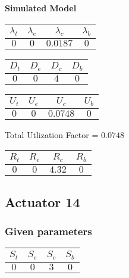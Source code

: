 \documentclass{article}
\begin{document}
\begin{minipage}{0.5\textwidth}
\centering	\textbf{Simulated Model}
\begin{table}[H]
\centering
\begin{tabular}{@{}cccc@{}}
\toprule
$\lambda_t$ & $\lambda_e$ & $\lambda_c$ & $\lambda_b$\\
\midrule
$0$ & $0$ & $0.0187$ & $0$\\
\bottomrule
\end{tabular}
\end{table}
\begin{table}[H]
\centering
\begin{tabular}{@{}cccc@{}}
\toprule
$D_t$ & $D_e$ & $D_c$ & $D_b$\\
\midrule
$0$ & $0$ & $4$ & $0$\\
\bottomrule
\end{tabular}
\end{table}\begin{table}[H]
\centering
\begin{tabular}{@{}cccc@{}}
\toprule
$U_t$ & $U_e$ & $U_c$ & $U_b$\\
\midrule
$0$ & $0$ & $0.0748$ & $0$\\
\bottomrule
\end{tabular}
\end{table}
\centering Total Utlization Factor = $0.0748$
\begin{table}[H]
\centering
\begin{tabular}{@{}cccc@{}}
\toprule
$R_t$ & $R_e$ & $R_c$ & $R_b$\\
\midrule
$0$ & $0$ & $4.32$ & $0$\\
\bottomrule
\end{tabular}
\end{table}
\end{minipage}\subsection{Actuator 14}
\subsubsection{Given parameters}
\begin{table}[H]
\centering
\begin{tabular}{@{}cccc@{}}
\toprule
$S_t$ & $S_e$ & $S_c$ & $S_b$\\
\midrule
$0$ & $0$ & $3$ & $0$\\
\bottomrule
\end{tabular}
\end{table}
\end{document}
